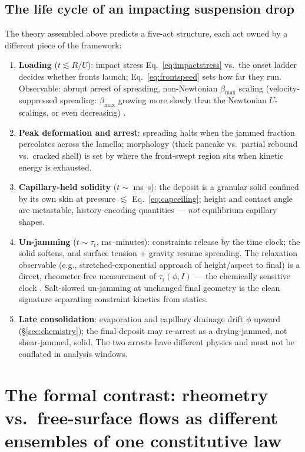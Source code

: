 \documentclass[11pt]{article}
\begin{document}
\subsection{The life cycle of an impacting suspension drop}
The theory assembled above predicts a five-act structure, each act owned by a different piece of the framework:
\begin{enumerate}
\item \textbf{Loading} ($t \lesssim R/U$): impact stress Eq.~\eqref{eq:impactstress} vs.\ the onset ladder decides whether fronts launch; Eq.~\eqref{eq:frontspeed} sets how far they run. Observable: abrupt arrest of spreading, non-Newtonian $\beta_{\max}$ scaling (velocity-suppressed spreading: $\beta_{\max}$ growing more slowly than the Newtonian $U$-scalings, or even decreasing) \cite{boyer2016impact}.
\item \textbf{Peak deformation and arrest}: spreading halts when the jammed fraction percolates across the lamella; morphology (thick pancake vs.\ partial rebound vs.\ cracked shell) is set by where the front-swept region sits when kinetic energy is exhausted.
\item \textbf{Capillary-held solidity} ($t \sim$ ms--s): the deposit is a granular solid confined by its own skin at pressure $\lesssim$ Eq.~\eqref{eq:capceiling}; height and contact angle are metastable, history-encoding quantities --- \emph{not} equilibrium capillary shapes.
\item \textbf{Un-jamming} ($t \sim \tau_{\mathrm{r}}$, ms--minutes): constraints release by the time clock; the solid softens, and surface tension + gravity resume spreading. The relaxation observable (e.g., stretched-exponential approach of height/aspect to final) is a direct, rheometer-free measurement of $\tau_{\mathrm{r}}(\phi, I)$ --- the chemically sensitive clock \cite{maharjan2017,barik2022,cho2022,shah2022}. Salt-slowed un-jamming at unchanged final geometry is the clean signature separating constraint kinetics from statics.
\item \textbf{Late consolidation}: evaporation and capillary drainage drift $\phi$ upward (\S\ref{sec:chemistry}); the final deposit may re-arrest as a drying-jammed, not shear-jammed, solid. The two arrests have different physics and must not be conflated in analysis windows.
\end{enumerate}

\section{The formal contrast: rheometry vs.\ free-surface flows as different ensembles of one constitutive law}
\label{sec:contrast}
\end{document}

